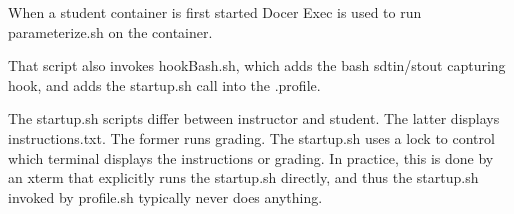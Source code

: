 When a student container is first started Docer Exec is used
to run parameterize.sh on the container.

That script also invokes hookBash.sh, which adds the bash
sdtin/stout capturing hook, and adds the startup.sh call
into the .profile.

The startup.sh scripts differ between instructor and student.  The latter
displays instructions.txt.  The former runs grading.
The startup.sh uses a lock to control which
terminal displays the instructions or grading.  In practice, this is done by
an xterm that explicitly runs the startup.sh directly, and thus
the startup.sh invoked by profile.sh typically never does anything.

